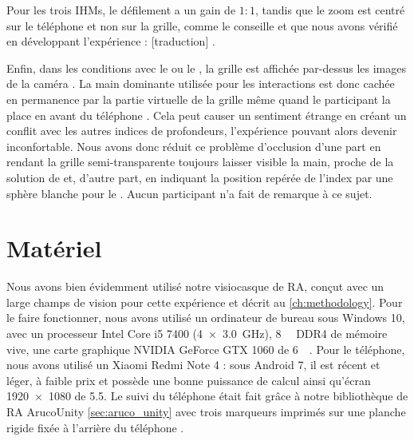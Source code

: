 
Pour les trois IHMs, le défilement a un gain de $1:1$, tandis que le zoom est centré sur le téléphone et non sur la grille, comme le conseille \cite{Guiard2004} et que nous avons vérifié en développant l'expérience : [traduction] .

Enfin, dans les conditions avec le  ou le , la grille est affichée par-dessus les images de la caméra . La main dominante utilisée pour les interactions est donc cachée en permanence par la partie virtuelle de la grille même quand le participant la place en avant du téléphone . Cela peut causer un sentiment étrange en créant un conflit avec les autres indices de profondeurs, l'expérience pouvant alors devenir inconfortable. Nous avons donc réduit ce problème d'occlusion d'une part en rendant la grille semi-transparente toujours laisser visible la main, proche de la solution de \cite{Piumsomboon2014} et, d'autre part, en indiquant la position repérée de l'index par une sphère blanche pour le . Aucun participant n'a fait de remarque à ce sujet.


\section{Matériel}
\label{sec:experiment_material}

Nous avons bien évidemment utilisé notre visiocasque de RA, conçut avec un large champs de vision pour cette expérience et décrit au \autoref{ch:methodology}. Pour le faire fonctionner, nous avons utilisé un ordinateur de bureau sous Windows 10, avec un processeur Intel Core i5 7400 (\SI[product-units = single]{4x3.0}{\GHz}), \SI{8}{\giga\byte} DDR4 de mémoire vive, une carte graphique NVIDIA GeForce GTX 1060 de \SI{6}{\giga\byte}. Pour le téléphone, nous avons utilisé un Xiaomi Redmi Note 4 : sous Android 7, il est récent et léger, à faible prix et possède une bonne puissance de calcul ainsi qu'écran \SI{1920x1080}{\px} de \SI{5.5}{\inch}. Le suivi du téléphone était fait grâce à notre bibliothèque de RA ArucoUnity \autoref{sec:aruco_unity} avec trois marqueurs imprimés sur une planche rigide fixée à l'arrière du téléphone .

